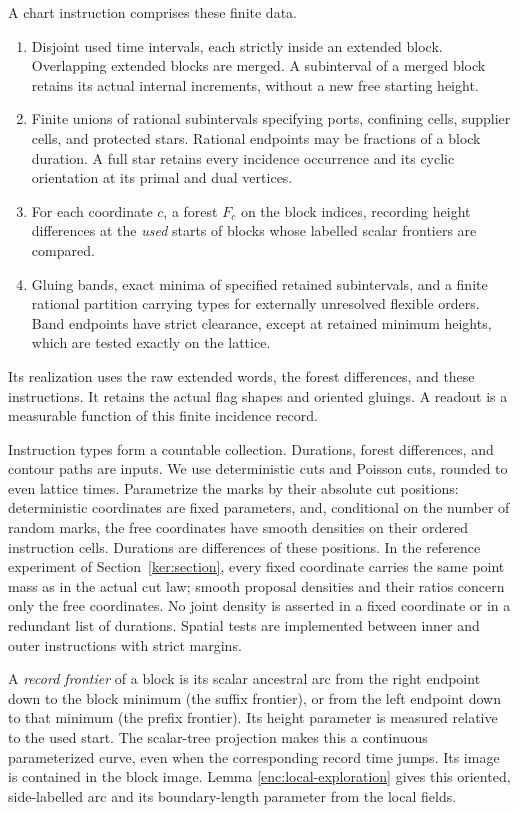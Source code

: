 \begin{definition}\label{ker:chart}
A chart instruction comprises these finite data.
\begin{enumerate}
\item Disjoint used time intervals, each strictly inside an extended
block.  Overlapping extended blocks are merged.  A subinterval of a
merged block retains its actual internal increments, without a new
free starting height.
\item Finite unions of rational subintervals specifying ports, confining
cells, supplier cells, and protected stars.  Rational endpoints may be
fractions of a block duration.  A full star retains every incidence
occurrence and its cyclic orientation at its primal and dual vertices.
\item For each coordinate \(c\), a forest \(F_c\) on the block indices,
recording height differences at the \emph{used} starts of blocks whose
labelled scalar frontiers are compared.
\item Gluing bands, exact minima of specified retained subintervals,
and a finite rational partition carrying types for externally unresolved
flexible orders.  Band endpoints have strict clearance, except at
retained minimum heights, which are tested exactly on the lattice.
\end{enumerate}
Its realization uses the raw extended words, the forest differences,
and these instructions.  It retains the actual flag shapes and
oriented gluings.  A readout is a measurable function of this finite
incidence record.
\end{definition}

Instruction types form a countable collection.  Durations, forest
differences, and contour paths are inputs.  We use deterministic cuts
and Poisson cuts, rounded to even lattice times.  Parametrize the
marks by their absolute cut positions: deterministic coordinates
are fixed parameters, and, conditional on the number of random
marks, the free coordinates have smooth densities on their ordered
instruction cells.  Durations are differences of these positions.
In the reference experiment of Section~\ref{ker:section}, every fixed
coordinate carries the same point mass as in the actual cut law;
smooth proposal densities and their ratios concern only the free
coordinates.  No joint density is asserted in a fixed coordinate
or in a redundant list of durations.  Spatial tests are implemented
between inner and outer instructions with strict margins.

A \emph{record frontier} of a block is its scalar ancestral arc
from the right endpoint down to the block minimum (the suffix
frontier), or from the left endpoint down to that minimum (the prefix
frontier).  Its height parameter is measured relative to the used
start.  The scalar-tree projection makes this a continuous
parameterized curve, even when the corresponding record time jumps.
Its image is contained in the block image.  Lemma
\ref{enc:local-exploration} gives this oriented, side-labelled arc and
its boundary-length parameter from the local fields.

